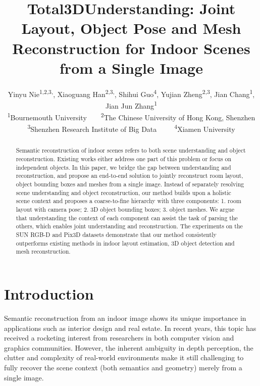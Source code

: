 \documentclass[10pt,twocolumn,letterpaper]{article}
\begin{document}
\title{Total3DUnderstanding: Joint Layout, Object Pose and Mesh Reconstruction for Indoor Scenes from a Single Image}

\author{Yinyu Nie\textsuperscript{1,2,3,}, Xiaoguang Han\textsuperscript{2,3,}, Shihui Guo\textsuperscript{4}, Yujian Zheng\textsuperscript{2,3}, Jian Chang\textsuperscript{1}, Jian Jun Zhang\textsuperscript{1}\\
\textsuperscript{1}Bournemouth University\ \ \ \
\textsuperscript{2}The Chinese University of Hong Kong, Shenzhen\\
\textsuperscript{3}Shenzhen Research Institute of Big Data\ \ \ \ \
\textsuperscript{4}Xiamen University
}



\maketitle
\let\thefootnote\relax{}
\let\thefootnote\relax{}
\begin{abstract}
	Semantic reconstruction of indoor scenes refers to both scene understanding and object reconstruction. Existing works either address one part of this problem or focus on independent objects. In this paper, we bridge the gap between understanding and reconstruction, and propose an end-to-end solution to jointly reconstruct room layout, object bounding boxes and meshes from a single image. Instead of separately resolving scene understanding and object reconstruction, our method builds upon a holistic scene context and proposes a coarse-to-fine hierarchy with three components: 1. room layout with camera pose; 2. 3D object bounding boxes; 3. object meshes. We argue that understanding the context of each component can assist the task of parsing the others, which enables joint understanding and reconstruction. The experiments on the SUN RGB-D and Pix3D datasets demonstrate that our method consistently outperforms existing methods in indoor layout estimation, 3D object detection and mesh reconstruction.
\end{abstract}

\section{Introduction}

Semantic reconstruction from an indoor image shows its unique importance in applications such as interior design and real estate. 
In recent years, this topic has received a rocketing interest from researchers in both computer vision and graphics communities.
However, the inherent ambiguity in depth perception, the clutter and complexity of real-world environments make it still challenging to
fully recover the scene context (both semantics and geometry) merely from a single image.
\end{document}
